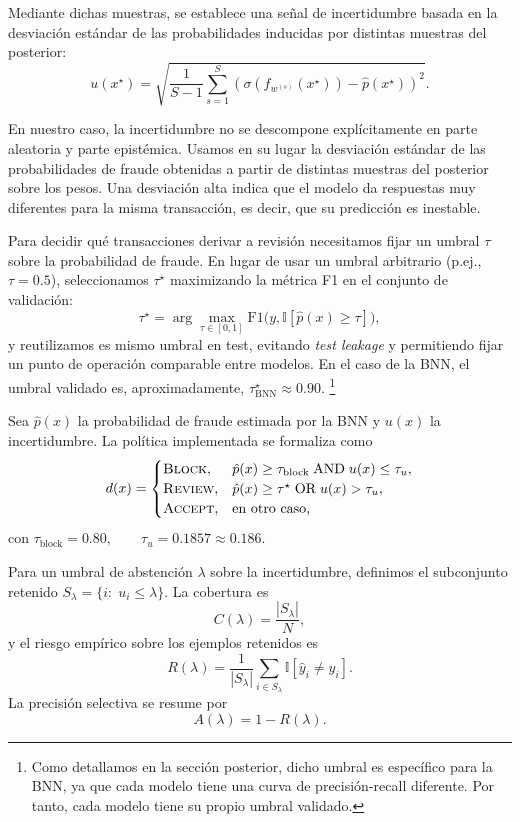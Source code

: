 \documentclass{article}
\begin{document}
Mediante dichas muestras, se establece una señal de incertidumbre basada en la desviación estándar de las probabilidades inducidas por distintas muestras del posterior:
\[
    u(x^\star)=
    \sqrt{
        \frac{1}{S-1}
        \sum_{s=1}^{S}
        \left(
        \sigma(f_{w^{(s)}}(x^\star))-\hat{p}(x^\star)
        \right)^2
    }.
\]

En nuestro caso, la incertidumbre no se descompone explícitamente en parte aleatoria y parte epistémica. Usamos en su lugar la desviación estándar de las probabilidades de fraude obtenidas a partir de distintas muestras del posterior sobre los pesos. Una desviación alta indica que el modelo da respuestas muy diferentes para la misma transacción, es decir, que su predicción es inestable.

Para decidir qué transacciones derivar a revisión necesitamos fijar un umbral $\tau$ sobre la probabilidad de fraude. En lugar de usar un umbral arbitrario (p.ej., $\tau=0.5$), seleccionamos \( \tau^\star \) maximizando la métrica F1 en el conjunto de validación:
\[
    \tau^\star=
    \arg\max_{\tau\in[0,1]}
    \mathrm{F1}\bigl(y,\mathbb{I}[\hat{p}(x)\ge \tau]\bigr),
\]
y reutilizamos es mismo umbral en test, evitando \emph{test leakage} y permitiendo fijar un punto de operación comparable entre modelos. En el caso de la BNN, el umbral validado es, aproximadamente, $\tau^\star_{\mathrm{BNN}} \approx 0.90.$ \footnote{Como detallamos en la sección posterior, dicho umbral es específico para la BNN, ya que cada modelo tiene una curva de precisión-recall diferente. Por tanto, cada modelo tiene su propio umbral validado.}

Sea $\hat{p}(x)$ la probabilidad de fraude estimada por la BNN y $u(x)$ la incertidumbre. La política implementada se formaliza como
\[
    d(x)=
    \begin{cases}
        \textsc{Block},  & \hat{p}(x)\ge \tau_{\mathrm{block}} \;\text{AND}\; u(x)\le \tau_u, \\
        \textsc{Review}, & \hat{p}(x)\ge \tau^\star \;\text{OR}\; u(x)>\tau_u,                \\
        \textsc{Accept}, & \text{en otro caso},
    \end{cases}
\]
con
$\tau_{\mathrm{block}}=0.80,\qquad \tau_u=0.1857 \approx 0.186.$

Para un umbral de abstención $\lambda$ sobre la incertidumbre, definimos el subconjunto retenido
$ S_{\lambda}=\{i:\;u_i\le \lambda\}. $
La cobertura es
\[
    C(\lambda)=\frac{|S_{\lambda}|}{N},
\]
y el riesgo empírico sobre los ejemplos retenidos es
\[
    R(\lambda)=
    \frac{1}{|S_{\lambda}|}
    \sum_{i\in S_{\lambda}}
    \mathbb{I}[\hat{y}_i\neq y_i].
\]
La precisión selectiva se resume por
\[
    A(\lambda)=1-R(\lambda).
\]
\end{document}
